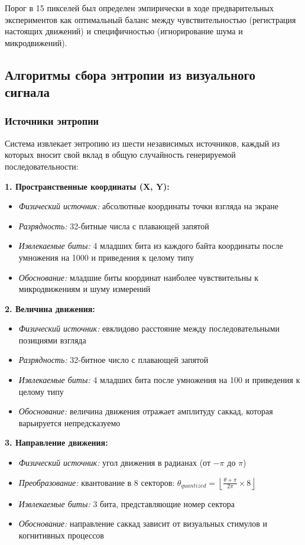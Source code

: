 \documentclass[14pt, a4paper]{extreport}
\begin{document}
Порог в 15 пикселей был определен эмпирически в ходе предварительных экспериментов как оптимальный баланс между чувствительностью (регистрация настоящих движений) и специфичностью (игнорирование шума и микродвижений).

\subsection{Алгоритмы сбора энтропии из визуального сигнала}

\subsubsection{Источники энтропии}

Система извлекает энтропию из шести независимых источников, каждый из которых вносит свой вклад в общую случайность генерируемой последовательности:

\textbf{1. Пространственные координаты (X, Y):}
\begin{itemize}
    \item \textit{Физический источник:} абсолютные координаты точки взгляда на экране
    \item \textit{Разрядность:} 32-битные числа с плавающей запятой
    \item \textit{Извлекаемые биты:} 4 младших бита из каждого байта координаты после умножения на 1000 и приведения к целому типу
    \item \textit{Обоснование:} младшие биты координат наиболее чувствительны к микродвижениям и шуму измерений
\end{itemize}

\textbf{2. Величина движения:}
\begin{itemize}
    \item \textit{Физический источник:} евклидово расстояние между последовательными позициями взгляда
    \item \textit{Разрядность:} 32-битное число с плавающей запятой
    \item \textit{Извлекаемые биты:} 4 младших бита после умножения на 100 и приведения к целому типу
    \item \textit{Обоснование:} величина движения отражает амплитуду саккад, которая варьируется непредсказуемо
\end{itemize}

\textbf{3. Направление движения:}
\begin{itemize}
    \item \textit{Физический источник:} угол движения в радианах (от $-\pi$ до $\pi$)
    \item \textit{Преобразование:} квантование в 8 секторов: $\theta_{quantized} = \left\lfloor \frac{\theta + \pi}{2\pi} \times 8 \right\rfloor$
    \item \textit{Извлекаемые биты:} 3 бита, представляющие номер сектора
    \item \textit{Обоснование:} направление саккад зависит от визуальных стимулов и когнитивных процессов
\end{itemize}
\end{document}
